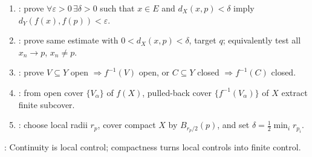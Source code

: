 \begin{method} \label{meth:continuity-proof-patterns-source-todo}\label{meth:continuity-proof-patterns} 
\begin{enumerate}[label=(\roman*)]
\setlength{\itemsep}{0pt}
\item {}: prove $\forall\varepsilon>0\,\exists\delta>0$ such that $x\in E$ and $d_X(x,p)<\delta$ imply $d_Y(f(x),f(p))<\varepsilon$.
\item {}: prove same estimate with $0<d_X(x,p)<\delta$, target $q$; equivalently test all $x_n\to p$, $x_n\neq p$.
\item {}: prove $V\subseteq Y$ open $\Rightarrow f^{-1}(V)$ open, or $C\subseteq Y$ closed $\Rightarrow f^{-1}(C)$ closed.
\item {}: from open cover $\{V_\alpha\}$ of $f(X)$, pulled-back cover $\{f^{-1}(V_\alpha)\}$ of $X$ extract finite subcover.
\item {}: choose local radii $r_p$, cover compact $X$ by $B_{r_p/2}(p)$, and set $\delta=\frac12\min_i r_{p_i}$.
\end{enumerate}
: Continuity is local control; compactness turns local controls into finite control.
\end{method}
